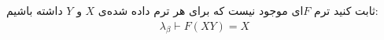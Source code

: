 ثابت کنید ترم $F$ای موجود نیست که برای هر ترم داده شده‌ی $X$ و $Y$ داشته باشیم:
\begin{gather*}
    \lambda_\beta \vdash F(XY) = X
\end{gather*}